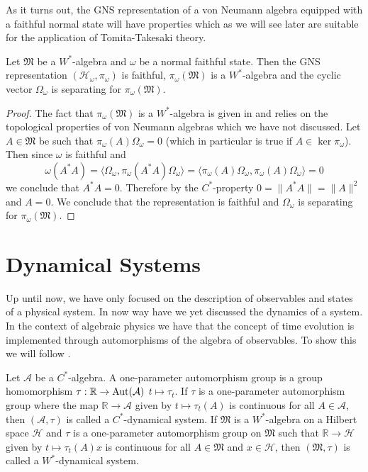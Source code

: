 As it turns out, the GNS representation of a von Neumann algebra equipped with a faithful normal state will have properties which as we will see later are suitable for the application of Tomita-Takesaki theory.

\begin{theorem}\label{thm:GNS_von}
Let $\mathfrak{M}$ be a $W^*$-algebra and $\omega$ be a normal faithful state. Then the GNS representation $(\mathcal{H}_\omega,\pi_\omega)$ is faithful, $\pi_\omega(\mathfrak{M})$ is a $W^*$-algebra and the cyclic vector $\Omega_\omega$ is separating for $\pi_\omega(\mathfrak{M})$.
\end{theorem} 

\begin{proof}
The fact that $\pi_\omega(\mathfrak{M})$ is a $W^*$-algebra is given in \cite{Bratteli1997} and relies on the topological properties of von Neumann algebras which we have not discussed. Let $A\in\mathfrak{M}$ be such that $\pi_\omega(A)\Omega_\omega=0$ (which in particular is true if $A\in\ker\pi_\omega$). Then since $\omega$ is faithful and
\begin{equation}
\omega(A^*A)=\langle \Omega_\omega, \pi_\omega (A^*A)\Omega_\omega\rangle=\langle \pi_\omega(A)\Omega_\omega,\pi_\omega(A)\Omega_\omega\rangle=0
\end{equation}
we conclude that $A^*A=0$. Therefore by the $C^*$-property $0=\|A^*A\|=\|A\|^2$ and $A=0$. We conclude that the representation is faithful and $\Omega_\omega$ is separating for $\pi_\omega(\mathfrak{M})$.
\end{proof}

\section{Dynamical Systems}

Up until now, we have only focused on the description of observables and states of a physical system. In now way have we yet discussed the dynamics of a system. In the context of algebraic physics we have that the concept of time evolution is implemented through automorphisms of the algebra of observables. To show this we will follow \cite{Duvenhage1999}.

\begin{definition}\label{def:dynamics}
Let $\mathcal{A}$ be a $C^*$-algebra. A one-parameter automorphism group is a group homomorphism $\tau:\mathbb{R}\rightarrow \operatorname{Aut}(\mathcal{A})$ $t\mapsto\tau_t$. If $\tau$ is a one-parameter automorphism group where the map $\mathbb{R}\rightarrow\mathcal{A}$ given by $t\mapsto\tau_t(A)$ is continuous for all $A\in\mathcal{A}$, then $(\mathcal{A},\tau)$ is called a $C^*$-dynamical system. If $\mathfrak{M}$ is a $W^*$-algebra on a Hilbert space $\mathcal{H}$ and $\tau$ is a one-parameter automorphism group on $\mathfrak{M}$ such that $\mathbb{R}\rightarrow\mathcal{H}$ given by $t\mapsto\tau_t(A)x$ is continuous for all $A\in\mathfrak{M}$ and $x\in\mathcal{H}$, then $(\mathfrak{M},\tau)$ is called a $W^*$-dynamical system. 
\end{definition}

